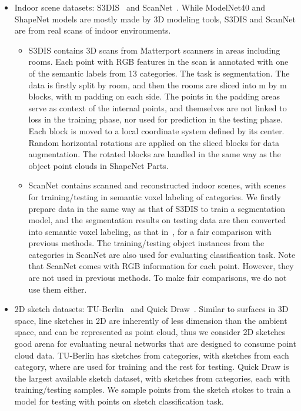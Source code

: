 \documentclass{article}
\begin{document}
\begin{itemize}[leftmargin=*]
	\item Indoor scene datasets: S3DIS~\cite{armeni20163d} and ScanNet~\cite{dai2017scannet}. While ModelNet40 and ShapeNet models are mostly made by 3D modeling tools, S3DIS and ScanNet are from real scans of indoor environments.
	\begin{itemize}
		\item S3DIS contains 3D scans from Matterport scanners in  areas including  rooms. Each point with RGB features in the scan is annotated with one of the semantic labels from 13 categories. The task is segmentation. The data is firstly split by room, and then the rooms are sliced into m by m blocks, with m padding on each side. The points in the padding areas serve as context of the internal points, and themselves are not linked to loss in the training phase, nor used for prediction in the testing phase. Each block is moved to a local coordinate system defined by its center. Random horizontal rotations are applied on the sliced blocks for data augmentation. The rotated blocks are handled in the same way as the object point clouds in ShapeNet Parts.
		\item ScanNet contains  scanned and reconstructed indoor scenes, with  scenes for training/testing in semantic voxel labeling of  categories. We firstly prepare data in the same way as that of S3DIS to train a segmentation model, and the segmentation results on testing data are then converted into semantic voxel labeling, as that in~\cite{Qi_NIPS17},  for a fair comparison with previous methods. The  training/testing object instances from the  categories in ScanNet are also used for evaluating classification task. Note that ScanNet comes with RGB information for each point. However, they are not used in previous methods. To make fair comparisons, we do not use them either.
	\end{itemize}
	


	\item 2D sketch datasets: TU-Berlin~\cite{Eitz_SIGGRAPH12} and Quick Draw~\cite{ha2017neural}. Similar to surfaces in 3D space, line sketches in 2D are inherently of less dimension than the ambient space, and can be represented as point cloud, thus we consider 2D sketches good arena for evaluating neural networks that are designed to consume point cloud data. TU-Berlin has sketches from  categories, with  sketches from each category, where  are used for training and the rest  for testing. Quick Draw is the largest available sketch dataset, with sketches from  categories, each with  training/testing samples. We sample  points from the sketch stokes to train a model for testing with  points on sketch classification task.
	

\end{itemize}
\end{document}
